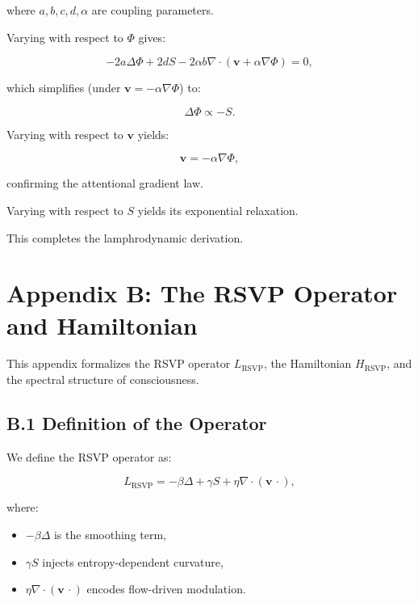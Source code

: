 \documentclass[12pt]{article}
\begin{document}
where $a,b,c,d,\alpha$ are coupling parameters.

Varying with respect to $\Phi$ gives:

\[
-2a \Delta \Phi
+ 2d S
- 2\alpha b \nabla \cdot (\mathbf{v} + \alpha \nabla \Phi)
= 0,
\]

which simplifies (under $\mathbf{v} = -\alpha \nabla\Phi$) to:

\[
\Delta \Phi \propto -S.
\]

Varying with respect to $\mathbf{v}$ yields:

\[
\mathbf{v} = -\alpha \nabla\Phi,
\]

confirming the attentional gradient law.

Varying with respect to $S$ yields its exponential relaxation.

This completes the lamphrodynamic derivation.


\section*{Appendix B: The RSVP Operator and Hamiltonian}

This appendix formalizes the RSVP operator $L_{\text{RSVP}}$, the Hamiltonian
$H_{\text{RSVP}}$, and the spectral structure of consciousness.

\subsection*{B.1 Definition of the Operator}

We define the RSVP operator as:

\[
L_{\text{RSVP}}
=
-\beta \Delta
+ \gamma S
+ \eta \nabla \cdot (\mathbf{v} \,\cdot),
\]

where:

\begin{itemize}
    \item $-\beta\Delta$ is the smoothing term,
    \item $\gamma S$ injects entropy-dependent curvature,
    \item $\eta \nabla \cdot (\mathbf{v}\,\cdot)$ encodes flow-driven modulation.
\end{itemize}
\end{document}
